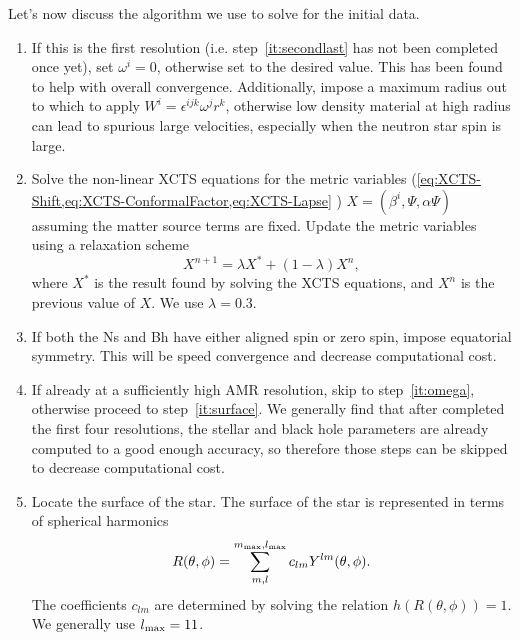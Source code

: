 Let's now discuss the algorithm we use to solve for the initial data. 

\begin{enumerate}
\item 
\label{it:1}
If this is the first resolution (i.e. step~\ref{it:secondlast} has not been
  completed once yet), set $\omega^i=0$, otherwise set
  to the desired value. This has been found to help with overall
  convergence. Additionally, impose a maximum radius out to which to
  apply $W^i=\epsilon^{ijk}\omega^jr^k$, otherwise low density
  material at high radius can lead to spurious large velocities,
  especially when the neutron star spin is large.

\item 
\label{it:solve}
Solve the non-linear XCTS equations for the metric variables (\cref{eq:XCTS-Shift,eq:XCTS-ConformalFactor,eq:XCTS-Lapse} )
  $X=\left(\beta^i,\Psi,\alpha\Psi\right)$ assuming the matter source
  terms are fixed. Update the metric variables using a relaxation
  scheme
\begin{equation}
\label{eq:Relaxation}
X^{n+1}=\lambda X^{*} + (1-\lambda)X^n,
\end{equation}
where $X^{*}$ is the result found by solving the XCTS equations, and $X^{n}$ is
the previous value of $X$.
We use $\lambda=0.3$.

\item If both the Ns and Bh have either aligned spin or zero spin,
  impose equatorial symmetry. This will be speed convergence and
  decrease computational cost.

\item
\label{it:toplevelparamsolve}
 If already at a sufficiently high AMR resolution, skip to step~\ref{it:omega}, otherwise proceed to step~\ref{it:surface}. We generally find that after completed the first four resolutions, 
the stellar and black hole parameters are already computed to a good enough accuracy, so therefore those steps can be skipped to decrease computational cost.

\item 
\label{it:surface}
Locate the surface of the star. The surface of the star is
  represented in terms of spherical harmonics
\begin{equation}
\label{eq:NSSurf}
R(\theta,\phi)=\sum_{m,l}^{m_{\rm max},l_{\rm max}} c_{lm}Y^{lm}(\theta,\phi)
.
\end{equation}
The coefficients $c_{lm}$ are determined by solving the relation $h\left(R\left(\theta,\phi\right)\right)=1$.
We generally use $l_{\rm max}=11$.


\end{enumerate}
